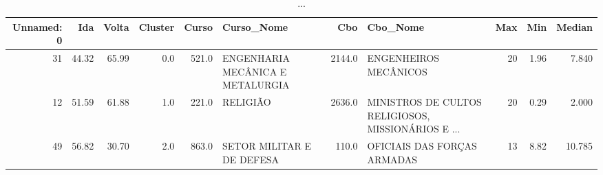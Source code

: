 \begin{table}
\centering
\caption{...}
\label{tab:Salarios_Desequlibrio_F}
\begin{tabular}{rrrrrlrlrrr}
\toprule
 Unnamed: 0 &   Ida &  Volta &  Cluster &  Curso &                       Curso\_Nome &    Cbo &                                           Cbo\_Nome &  Max &  Min &  Median \\
\midrule
         31 & 44.32 &  65.99 &      0.0 &  521.0 & ENGENHARIA MECÂNICA E METALURGIA & 2144.0 &                              ENGENHEIROS MECÂNICOS &   20 & 1.96 &   7.840 \\
         12 & 51.59 &  61.88 &      1.0 &  221.0 &                         RELIGIÃO & 2636.0 & MINISTROS DE CULTOS RELIGIOSOS, MISSIONÁRIOS E ... &   20 & 0.29 &   2.000 \\
         49 & 56.82 &  30.70 &      2.0 &  863.0 &        SETOR MILITAR E DE DEFESA &  110.0 &                        OFICIAIS DAS FORÇAS ARMADAS &   13 & 8.82 &  10.785 \\
\bottomrule
\end{tabular}
\end{table}
